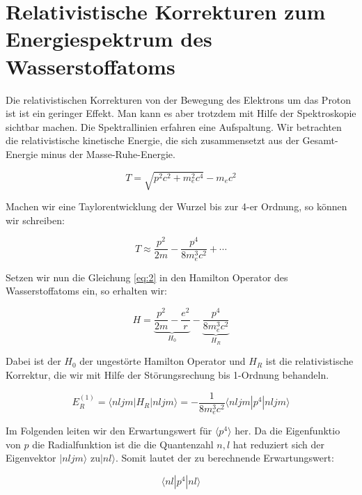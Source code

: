 
\usepackage{amsmath}




\section*{Relativistische Korrekturen zum Energiespektrum des Wasserstoffatoms}


Die relativistischen Korrekturen von der Bewegung des Elektrons um das Proton ist ist ein geringer Effekt. Man kann es aber trotzdem mit Hilfe der Spektroskopie sichtbar machen. Die Spektrallinien erfahren eine Aufspaltung. Wir betrachten die relativistische kinetische Energie, die sich zusammensetzt aus der Gesamt-Energie minus der Masse-Ruhe-Energie.

\begin{equation}
  \label{eq:1}
  T = \sqrt{p^2c^2+m_e^2c^4}-m_ec^2
\end{equation}


Machen wir eine Taylorentwicklung der Wurzel bis zur 4-er Ordnung, so können wir schreiben:

\begin{equation}
  \label{eq:2}
  T \approx \frac{p^2}{2m}-\frac{p^4}{8m_e^3c^2}+\cdots
\end{equation}


Setzen wir nun die Gleichung \eqref{eq:2} in den Hamilton Operator des Wasserstoffatoms ein, so erhalten wir:


\begin{equation}
  \label{eq:3}
  H = \underbrace{\frac{p^2}{2m}-\frac{e^2}{r}}_{H_0}-\underbrace{\frac{p^4}{8m_e^3c^2}}_{H_R}
\end{equation}


Dabei ist der \(H_0\) der ungestörte Hamilton Operator und \(H_R\) ist die relativistische Korrektur, die wir mit Hilfe der Störungsrechung bis 1-Ordnung behandeln.

\begin{equation}
  \label{eq:4}
  E^{(1)}_R = \langle nljm|H_R|nljm\rangle  = - \frac{1}{8m_e^3c^2}\langle nljm|p^4|nljm\rangle
\end{equation}

Im Folgenden leiten wir den Erwartungswert für \(\langle p^4 \rangle \) her. Da die Eigenfunktio von \(p\) die Radialfunktion ist die die Quantenzahl \(n,l\) hat reduziert sich der Eigenvektor  \(|nljm\rangle \)  zu\(|nl\rangle \). Somit lautet der zu berechnende Erwartungswert:

\begin{equation}
  \label{eq:5}
  \langle nl|p^4|nl\rangle
\end{equation}

